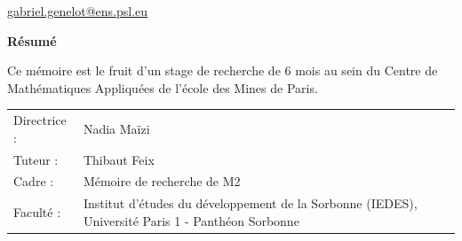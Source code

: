 \begin{titlepage}

\begin{center}

{\makeatletter
\largetitlestyle\fontsize{45}{45}\selectfont\@title
\makeatother}

{\makeatletter
\ifdefvoid{\@subtitle}{}{\bigskip\titlestyle\fontsize{20}{20}\selectfont\@subtitle}
\makeatother}


\bigskip
\bigskip

{\makeatletter
\largetitlestyle\fontsize{25}{25}\selectfont\@author
\makeatother}

\bigskip

\href{mailto:gabriel.genelot@ens.psl.eu}{gabriel.genelot@ens.psl.eu}

\bigskip
\bigskip


\vfill

\textbf{Résumé} \\

\begin{center}
\justify


Ce mémoire est le fruit d'un stage de recherche de 6 mois au sein du Centre de Mathématiques Appliquées de l'école des Mines de Paris.

\end{center}


\bigskip

\bigskip

\begin{tabular}{lp{10cm}}
    Directrice : & Nadia Maïzi \\
    Tuteur : &  Thibaut Feix\\
    Cadre : & Mémoire de recherche de M2 \\
    Faculté : & Institut d'études du développement de la Sorbonne (IEDES), Université Paris 1 - Panthéon Sorbonne
\end{tabular}

\bigskip
\bigskip

\begin{tabular}{p{15mm}p{10cm}}
\end{tabular}


\end{center}
\end{titlepage}
